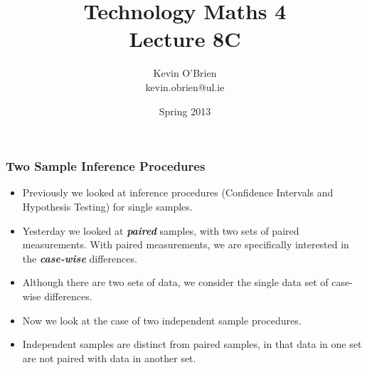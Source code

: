 \documentclass[a4]{beamer}
\title[MA4704]{Technology Maths 4 \\ {\normalsize Lecture 8C}}
\author[Kevin O'Brien]{Kevin O'Brien \\ {\scriptsize kevin.obrien@ul.ie}}
\date{Spring 2013}
\institute[Maths \& Stats]{Dept. of Mathematics \& Statistics, \\ University \textit{of} Limerick}
\begin{document}
\begin{frame}
\titlepage
\end{frame}



\begin{frame}
\frametitle{Two Sample Inference Procedures}
\begin{itemize}
\item Previously we looked at inference procedures (Confidence Intervals and Hypothesis Testing) for single samples.
\item Yesterday we looked at \textit{\textbf{paired}} samples, with two sets of paired measurements. With paired measurements, we are specifically interested in the \textbf{\textit{case-wise}} differences.
\item Although there are two sets of data, we consider the single data set of case-wise differences.
\item Now we look at the case of two independent sample procedures.
\item Independent samples are distinct from paired samples, in that data in one set are not paired with data in another set.
\end{itemize}
\end{frame}
\end{document}
